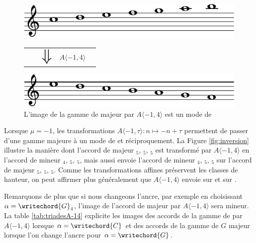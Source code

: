 \begin{figure}
  \includegraphics[width=\columnwidth]{c-maj-crop.pdf}
  \begin{tabularx}{\columnwidth}{ YYYYZ }
    &&$ \mathlarger{\mathlarger{\mathlarger{\mathlarger{\mathlarger{\mathlarger\Downarrow}}}}} $ & $A\langle -1,4 \rangle$&
    \end{tabularx}
  \includegraphics[width=\columnwidth]{e-mod-crop.pdf}
  \caption{L'image de la gamme de  majeur par $A\langle -1,4 \rangle$ est un mode de  }
\end{figure}

Lorsque $\mu = -1$, les transformations $A \langle -1,\tau\rangle : n\mapsto -n + \tau$ permettent de passer d'une gamme majeure à un mode de  et réciproquement. La Figure \ref{fig:inversion} illustre la manière dont l'accord de  majeur $_5$, $_5$, $_5$ est transformé par $A\langle -1,4 \rangle$ en l'accord de  mineur  $_4$, $_5$, $_5$, mais aussi envoie l'accord de  mineur $_4$, $_5$, $_5$ sur l'accord de  majeur  $_5$, $_5$, $_5$. Comme les transformations affines préservent les classes de hauteur, on peut affirmer plus généralement que $A \langle -1,4\rangle$ envoie   sur    et  sur . 

Remarquons de plus que si nous changeons l'ancre, par exemple en choisissant $\alpha = \writechord{G}_4$, l'image de l'accord de  majeur par $A\langle-1,4 \rangle$ sera  mineur. La table \ref{tab:triadesA-14} explicite les images des accords de la gamme de  par $A\langle -1,4 \rangle$ lorsque $\alpha = \writechord{C}$ et des accords de la gamme de $G$ majeur lorsque l'on change l'ancre pour $\alpha = \writechord{G}$.


